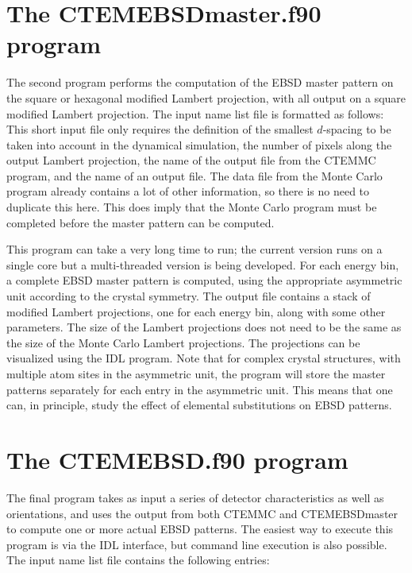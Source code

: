 \documentclass[DIV=calc, paper=letter, fontsize=11pt]{scrartcl}	 %
\begin{document}
\section{The \protect\textsf{CTEMEBSDmaster.f90} program\label{sec:f90EBSDmaster}}
The second program performs the computation of the EBSD master pattern on the
square or hexagonal modified Lambert projection, with all output on a square modified Lambert projection.
The input name list file is formatted as follows:
This short input file only requires the definition of the smallest $d$-spacing to be taken into account 
in the dynamical simulation, the number of pixels along the output Lambert projection, the name of the 
output file from the \textsf{CTEMMC} program, and the name of an output file.  The data file from
the Monte Carlo program already contains a lot of other information, so there is no need to duplicate 
this here.  This does imply that the Monte Carlo program must be completed before the 
master pattern can be computed.

This program can take a very long time to run; the current version runs on a single core but a multi-threaded version 
is being developed.  For each energy bin, a complete EBSD master pattern is computed, using the appropriate asymmetric unit according to
the crystal symmetry.  The output file contains a stack of modified Lambert projections, one for each energy bin, along with 
some other parameters.  The size of the Lambert projections does not need to be the same as the size of the Monte Carlo
Lambert projections.  The projections can be visualized using the IDL program.  Note that for complex crystal structures,
with multiple atom sites in the asymmetric unit, the program will store the master patterns separately for each entry in the asymmetric unit.
This means that one can, in principle, study the effect of elemental substitutions on EBSD patterns.

\section{The \protect\textsf{CTEMEBSD.f90} program\label{sec:f90EBSD}}
The final program takes as input a series of detector characteristics as well as orientations, and uses the output from both \textsf{CTEMMC} and
\textsf{CTEMEBSDmaster} to compute one or more actual EBSD patterns.  The easiest way to execute this program is 
via the IDL interface, but command line execution is also possible.  The input name list file contains the following entries:
\end{document}
